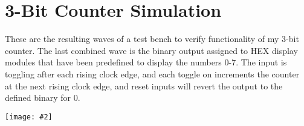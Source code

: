 \documentclass{article}
\newenvironment{solution}{\begin{mdframed}[style=SolutionFrame]}{\end{mdframed}}
\newcommand{\img}[2][1.0]{
    \begin{minipage}[t]{0.9\linewidth}
        \begin{center}
            \texttt{[image: \#2]}
        \end{center}
    \end{minipage}
}
\begin{document}
\newpage
\section{3-Bit Counter Simulation}
    \begin{solution}
        These are the resulting waves of a test bench to verify functionality of my 3-bit counter. The last combined wave is the binary output assigned to HEX display modules that have been predefined to display the numbers 0-7. The input is toggling after each rising clock edge, and each toggle on increments the counter at the next rising clock edge, and reset inputs will revert the output to the defined binary for 0. \\
        \img[1.1]{counter_waves.png}
    \end{solution}
\end{document}
